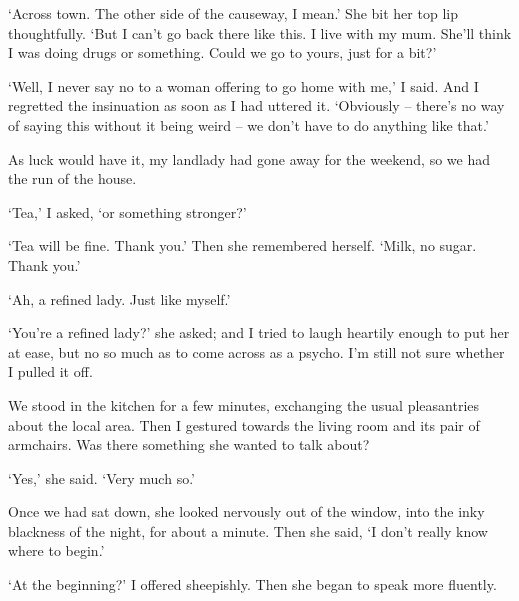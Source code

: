 `Across town. The other side of the causeway, I mean.' She bit her top lip thoughtfully. `But I can't go back there like this. I live with my mum. She'll think I was doing drugs or something. Could we go to yours, just for a bit?'

`Well, I never say no to a woman offering to go home with me,' I said. And I regretted the insinuation as soon as I had uttered it. `Obviously -- there's no way of saying this without it being weird -- we don't have to do anything like that.'

\divsep

As luck would have it, my landlady had gone away for the weekend, so we had the run of the house.

`Tea,' I asked, `or something stronger?'

`Tea will be fine. Thank you.' Then she remembered herself. `Milk, no sugar. Thank you.'

`Ah, a refined lady. Just like myself.'

`You're a refined lady?' she asked; and I tried to laugh heartily enough to put her at ease, but no so much as to come across as a psycho. I'm still not sure whether I pulled it off.

We stood in the kitchen for a few minutes, exchanging the usual pleasantries about the local area. Then I gestured towards the living room and its pair of armchairs. Was there something she wanted to talk about?

`Yes,' she said. `Very much so.'

Once we had sat down, she looked nervously out of the window, into the inky blackness of the night, for about a minute. Then she said, `I don't really know where to begin.'

`At the beginning?' I offered sheepishly. Then she began to speak more fluently.

